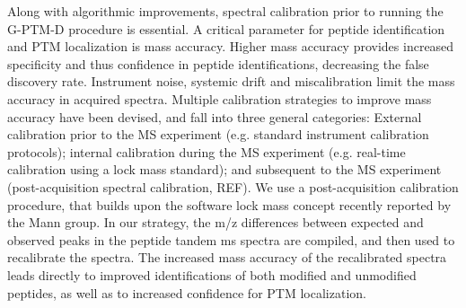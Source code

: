 \documentclass[journal=jprobs,manuscript=article]{achemso}
\begin{document}
Along with algorithmic improvements, spectral calibration prior to running the G-PTM-D procedure is essential.
A critical parameter for peptide identification and PTM localization is mass accuracy\cite{Scherl_2008}.
Higher mass accuracy provides increased specificity and thus confidence in peptide identifications, decreasing the false discovery rate.
Instrument noise, systemic drift and miscalibration limit the mass accuracy in acquired spectra.
Multiple calibration strategies to improve mass accuracy have been devised, and fall into three general categories:  External calibration prior to the MS experiment (e.g. standard instrument calibration protocols); internal calibration during the MS experiment (e.g. real-time calibration using a lock mass standard\cite{Olsen_2005}); and subsequent to the MS experiment (post-acquisition spectral calibration, REF).
We use a post-acquisition calibration procedure, that builds upon the software lock mass concept\cite{Cox_2011} recently reported by the Mann group.
In our strategy, the m/z differences between expected and observed peaks in the peptide tandem ms spectra are compiled, and then used to recalibrate the spectra.
The increased mass accuracy of the recalibrated spectra leads directly to improved identifications of both modified and unmodified peptides, as well as to increased confidence for PTM localization.

\begin{figure}
\end{figure}
\end{document}
